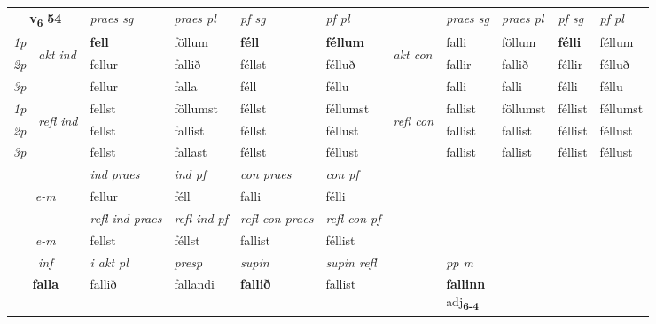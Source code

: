 \noindent
\begin{tabular}{lllllllllll} \toprule
\multicolumn{2}{c}{\textbf{v{\textsubscript{6}}} \Large{\textbf{54}}}  &  \textit{praes sg}  & \textit{praes pl}  &\textit{ pf sg} & \textit{pf pl} &  &  \textit{praes sg}  & \textit{praes pl}  & \textit{pf sg} & \textit{pf pl } \\*
	\cmidrule{3-6} \cmidrule{8-11}
 {\textit{1p}} & \multirow{3}{*}{\begin{turn}{90}\textit{akt ind}\end{turn}} & \textbf{fell} & föllum & \textbf{féll} & \textbf{féllum} & \multirow{3}{*}{\begin{turn}{90}\textit{akt con}\end{turn}} &falli & föllum & \textbf{félli} & féllum\\*
 {\textit{2p}} &  &  fellur  & fallið & féllst & félluð & & fallir & fallið & féllir & félluð \\*
{\textit{3p}} &  & fellur & falla & féll & féllu & & falli & falli& félli & féllu \\*
\cmidrule{3-6} \cmidrule{8-11}
 {\textit{1p}} & \multirow{3}{*}{\begin{turn}{90}\textit{refl ind}\end{turn}}  & fellst & föllumst & féllst & féllumst & \multirow{3}{*}{\begin{turn}{90}\textit{refl con}\end{turn}}  &fallist & föllumst & féllist & féllumst \\*
 {\textit{2p}} &  & fellst & fallist & féllst & féllust & &fallist & fallist & féllist & féllust \\*
 {\textit{3p}}  & & fellst & fallast & féllst & féllust & & fallist & fallist& féllist & féllust \\*
\cmidrule{3-6} \cmidrule{8-11}

   & &  \textit{ind praes} & \textit{ind pf} & \textit{con praes} & \textit{con pf} \\*
\multicolumn{2}{c}{ \textit{e-m} } & fellur & féll & falli & félli \\*

\cmidrule{3-6}
 & & \textit{refl ind praes} & \textit{refl ind pf} & \textit{refl con praes} & \textit{refl con pf} \\*
 \multicolumn{2}{c}{ \textit{e-m} }& fellst & féllst & fallist & féllist \\*

\cmidrule{3-8}
   \multicolumn{2}{c}{\textit{inf}}  & \textit{i akt pl}   & \textit{presp} & \textit{supin} & \textit{supin refl} && \textit{pp m} \\*
  \multicolumn{2}{c}{\textbf{falla}}   & fallið   & fallandi &  \textbf{fallið} & fallist && \specialcell{\textbf{fallinn} \\ adj\textbf{\textsubscript{6-4}}} \\*
\end{tabular}

